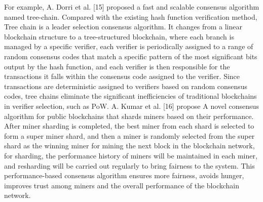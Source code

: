 \documentclass[lettersize,journal]{IEEEtran}
\begin{document}
For example, A. Dorri et al. [15] proposed a fast and scalable consensus algorithm named tree-chain. Compared with the existing hash function verification method, Tree chain is a leader selection consensus algorithm. It changes from a linear blockchain structure to a tree-structured blockchain, where each branch is managed by a specific verifier, each verifier is periodically assigned to a range of random consensus codes that match a specific pattern of the most significant bits output by the hash function, and each verifier is then responsible for the transactions it falls within the consensus code assigned to the verifier. Since transactions are deterministic assigned to verifiers based on random consensus codes, tree chains eliminate the significant inefficiencies of traditional blockchains in verifier selection, such as PoW. A. Kumar et al. [16] propose A novel consensus algorithm for public blockchains that shards miners based on their performance. After miner sharding is completed, the best miner from each shard is selected to form a super miner shard, and then a miner is randomly selected from the super shard as the winning miner for mining the next block in the blockchain network, for sharding, the performance history of miners will be maintained in each miner, and resharding will be carried out regularly to bring fairness to the system. This performance-based consensus algorithm ensures more fairness, avoids hunger, improves trust among miners and the overall performance of the blockchain network.
\end{document}
